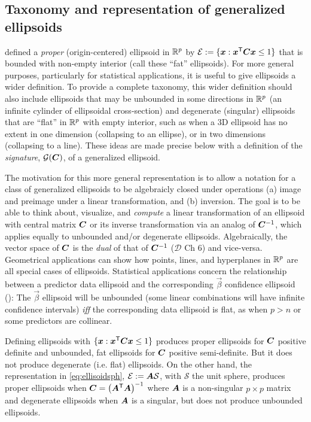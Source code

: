 \subsection{Taxonomy and representation of generalized ellipsoids}\label{sec:taxonomy}
 defined a \emph{proper} (origin-centered) ellipsoid in  $\mathbb{R}^{p}$ by
$\mathcal{E} := \{ \bm{x}: \bm{x}^\mathsf{T} \bm{C} \bm{x} \le 1 \}$ that is bounded with non-empty interior (call these ``fat'' ellipsoids).
For more general purposes, particularly for statistical applications,
it is useful to give ellipsoids a wider definition.
To provide a complete taxonomy, this wider definition should also include ellipsoids that may be unbounded in some directions in $\mathbb{R}^{p}$
(an infinite cylinder of ellipsoidal cross-section) and
degenerate (singular) ellipsoids that are ``flat'' in  $\mathbb{R}^{p}$ with empty interior, such as when a 3D ellipsoid has no extent in
one dimension (collapsing to an ellipse), or in two dimensions (collapsing to a line).  These ideas are made precise below
with a definition of the \emph{signature}, $\mathcal{G}(\bm{C})$, of a generalized ellipsoid.

The motivation for this more general representation is to allow a notation for a class of generalized ellipsoids to be
algebraicly closed under operations (a) image and preimage under a linear transformation, and (b) inversion.
The goal is to be able to think about, visualize, and \emph{compute} a linear transformation of an ellipsoid with central matrix
$\bm{C}$ or its inverse transformation via an analog of $\bm{C}^{-1}$, which applies equally to unbounded
and/or degenerate ellipsoids. 
Algebraically, the vector space of $\bm{C}$ is the \emph{dual} of that of $\bm{C}^{-1}$ ($\mathcal{D}$ Ch 6) and vice-versa.
Geometrical applications can show how points, lines, and hyperplanes 
in  $\mathbb{R}^{p}$ are all special cases of ellipsoids.
Statistical applications concern the relationship between a predictor data ellipsoid and the
corresponding $\vec{\beta}$ confidence ellipsoid (): The $\vec{\beta}$ ellipsoid will be unbounded (some linear combinations
will have infinite confidence intervals) \emph{iff} the corresponding data ellipsoid is flat, as when $p>n$ or some predictors are collinear.

Defining ellipsoids with $\{ \bm{x}: \bm{x}^\mathsf{T} \bm{C} \bm{x} \le 1 \}$ produces proper ellipsoids for $\bm{C}$
positive definite and unbounded, fat ellipsoids for $\bm{C}$ positive semi-definite.
But it does not produce degenerate (i.e. flat) ellipsoids.  On the other hand,
the representation in \eqref{eq:ellisoidsph},
$\mathcal{E} := \bm{A} \mathcal{S}$, with $\mathcal{S}$ the unit sphere,
 produces proper ellipsoids when $\bm{C} = \left( \bm{A} ^\mathsf{T} \bm{A} \right)^{-1}$
where $\bm{A}$ is a non-singular $p \times p$ matrix and degenerate ellipsoids when $\bm{A}$ is a singular, but does not
produce unbounded ellipsoids.

